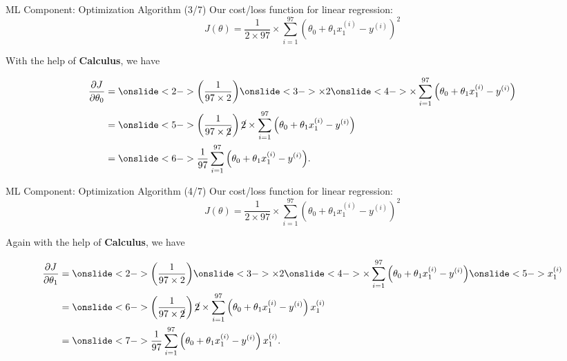 \documentclass[pdf]{beamer}
\theoremstyle{mystyle}
\begin{document}
\begin{frame}{ML Component: Optimization Algorithm (3/7)}
Our cost/loss function for linear regression:
\begin{equation*}
	J(\theta) = \frac{1}{2 \times 97} \times \sum_{i=1}^{97}{\left(\theta_0 + \theta_1 x_1^{(i)} - y^{(i)}\right)^2}
\end{equation*}	

With the help of \textbf{Calculus}, we have

\begin{align*}
	\frac{\partial{J}}{\partial{\theta_0}} &= \onslide<2->{ \left( \frac{1}{97 \times 2} \right)} \onslide<3->{\times  2} \onslide<4->{\times \sum_{i=1}^{97}{\left(\theta_0 + \theta_1 x_1^{(i)} - y^{(i)}\right)} }  \\
	                                       &= \onslide<5->{\left( \frac{1}{97 \times \cancel{2}} \right) \cancel{2} \times \sum_{i=1}^{97}{\left(\theta_0 + \theta_1 x_1^{(i)} - y^{(i)}\right)} }  \\
	                                       &= \onslide<6->{\frac{1}{97} \sum_{i=1}^{97}{\left(\theta_0 + \theta_1 x_1^{(i)} - y^{(i)}\right) }.}
\end{align*}
\end{frame}

\begin{frame}{ML Component: Optimization Algorithm (4/7)}
Our cost/loss function for linear regression:
\begin{equation*}
	J(\theta) = \frac{1}{2 \times 97} \times \sum_{i=1}^{97}{\left(\theta_0 + \theta_1 x_1^{(i)} - y^{(i)}\right)^2}
\end{equation*}	

Again with the help of \textbf{Calculus}, we have

\begin{align*}
	\frac{\partial{J}}{\partial{\theta_1}} &= \onslide<2->{\left( \frac{1}{97 \times 2} \right)} \onslide<3->{\times 2} \onslide<4->{\times \sum_{i=1}^{97}{\left(\theta_0 + \theta_1 x_1^{(i)} - y^{(i)}\right)} \onslide<5->{x_1^{(i)} }}  \\
	                                       &= \onslide<6->{\left( \frac{1}{97 \times \cancel{2}} \right) \cancel{2} \times \sum_{i=1}^{97}{\left(\theta_0 + \theta_1 x_1^{(i)} - y^{(i)}\right) x_1^{(i)} }}  \\
	                                       &= \onslide<7->{\frac{1}{97} \sum_{i=1}^{97}{\left(\theta_0 + \theta_1 x_1^{(i)} - y^{(i)}\right) x_1^{(i)} }.}	 
\end{align*}
\end{frame}
\end{document}

